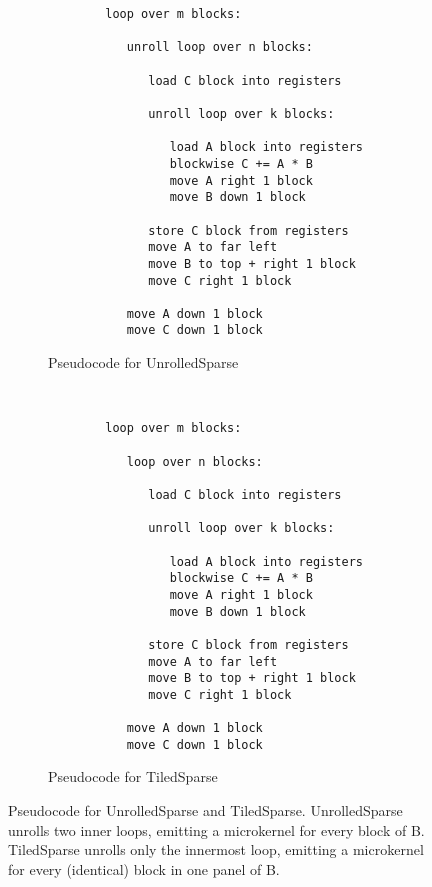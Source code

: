 \begin{figure}[ht]
  \begin{subfigure}[b]{0.45\textwidth}
      \begin{verbatim}
        loop over m blocks:

           unroll loop over n blocks:

              load C block into registers

              unroll loop over k blocks:

                 load A block into registers
                 blockwise C += A * B
                 move A right 1 block
                 move B down 1 block

              store C block from registers
              move A to far left
              move B to top + right 1 block
              move C right 1 block

           move A down 1 block
           move C down 1 block
      \end{verbatim}    
      \caption{Pseudocode for UnrolledSparse}
    \label{fig:pseudocode_unrolled}
  \end{subfigure}
  ~~~~~~
  \begin{subfigure}[b]{0.45\textwidth}
      \begin{verbatim}
        loop over m blocks:

           loop over n blocks:

              load C block into registers

              unroll loop over k blocks:

                 load A block into registers
                 blockwise C += A * B
                 move A right 1 block
                 move B down 1 block

              store C block from registers
              move A to far left
              move B to top + right 1 block
              move C right 1 block

           move A down 1 block
           move C down 1 block
      \end{verbatim}    
      \caption{Pseudocode for TiledSparse}
    \label{fig:pseudocode_tiled}

  \end{subfigure}
    \caption{Pseudocode for UnrolledSparse and TiledSparse. UnrolledSparse unrolls two inner loops, emitting a microkernel for every block of B. TiledSparse unrolls only the innermost loop, emitting a microkernel for every (identical) block in one panel of B.}
    \label{fig:pseudocode_unrolled_tiled}

\end{figure}



